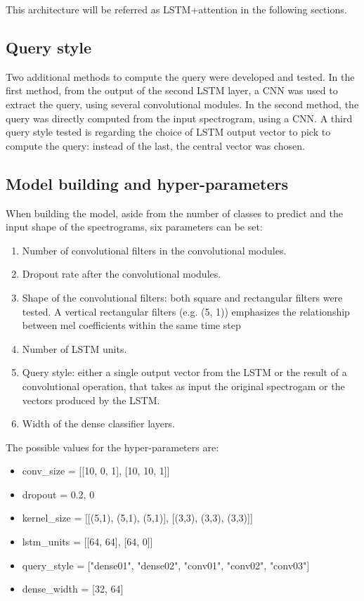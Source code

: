 This architecture will be referred as LSTM+attention in the following sections.

\subsection{Query style}

Two additional methods to compute the query were developed and tested.
In the first method, from the output of the second LSTM layer, a CNN was used
to extract the query, using several convolutional modules.
In the second method, the query was directly computed from the input
spectrogram, using a CNN.
A third query style tested is regarding the choice of LSTM output vector to
pick to compute the query: instead of the last, the central vector was chosen.


\subsection{Model building and hyper-parameters}

When building the model, aside from the number of classes to predict and the
input shape of the spectrograms, six parameters can be set:
\begin{enumerate}
    \item Number of convolutional filters in the convolutional modules.
    \item Dropout rate after the convolutional modules.
    \item Shape of the convolutional filters:
        both square and rectangular filters were tested.
        A vertical rectangular filters (e.g. (5, 1)) emphasizes the
        relationship between mel coefficients within the same time step
    \item Number of LSTM units.
    \item Query style: either a single output vector from the LSTM or the
        result of a convolutional operation, that takes as input the original
        spectrogam or the vectors produced by the LSTM.
    \item Width of the dense classifier layers.
\end{enumerate}
The possible values for the hyper-parameters are:
\begin{itemize}
    \item conv\_size = [[10, 0, 1], [10, 10, 1]]
    \item dropout = {0.2, 0}
    \item kernel\_size = [[(5,1), (5,1), (5,1)], [(3,3), (3,3), (3,3)]]
    \item lstm\_units = [[64, 64], [64, 0]]
    \item query\_style = ["dense01", "dense02", "conv01", "conv02", "conv03"]
    \item dense\_width = [32, 64]
\end{itemize}

